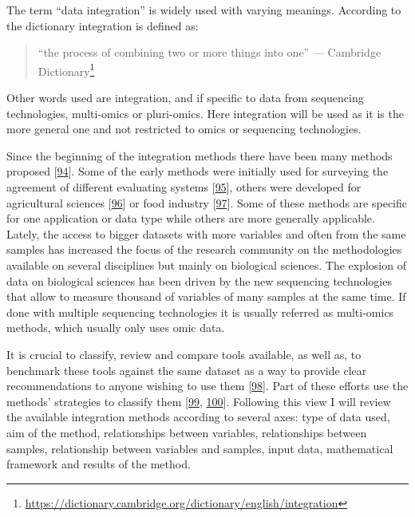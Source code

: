 \documentclass[
  12pt,
  a4paper,
  twoside,
  openright]{book}
\DeclareRobustCommand{\href}[2]{#2\footnote{\url{#1}}}
\begin{document}
The term ``data integration'' is widely used with varying meanings.
According to the dictionary integration is defined as:

\begin{quote}
``the process of combining two or more things into one'' --- \href{https://dictionary.cambridge.org/dictionary/english/integration}{Cambridge Dictionary}
\end{quote}

Other words used are integration, and if specific to data from sequencing technologies, multi-omics or pluri-omics.
Here integration will be used as it is the more general one and not restricted to omics or sequencing technologies.

Since the beginning of the integration methods there have been many methods proposed {[}\protect\hyperlink{ref-krassowski2020}{94}{]}.
Some of the early methods were initially used for surveying the agreement of different evaluating systems {[}\protect\hyperlink{ref-yannakoudakis2015}{95}{]}, others were developed for agricultural sciences {[}\protect\hyperlink{ref-hotelling_relations_1936}{96}{]} or food industry {[}\protect\hyperlink{ref-biancolillo}{97}{]}.
Some of these methods are specific for one application or data type while others are more generally applicable.
Lately, the access to bigger datasets with more variables and often from the same samples has increased the focus of the research community on the methodologies available on several disciplines but mainly on biological sciences.
The explosion of data on biological sciences has been driven by the new sequencing technologies that allow to measure thousand of variables of many samples at the same time.
If done with multiple sequencing technologies it is usually referred as multi-omics methods, which usually only uses omic data.

It is crucial to classify, review and compare tools available, as well as, to benchmark these tools against the same dataset as a way to provide clear recommendations to anyone wishing to use them {[}\protect\hyperlink{ref-wu_selective_2019}{98}{]}.
Part of these efforts use the methods' strategies to classify them {[}\protect\hyperlink{ref-cavill2016}{99}, \protect\hyperlink{ref-chongComputationalApproachesIntegrative2017}{100}{]}.
Following this view I will review the available integration methods according to several axes: type of data used, aim of the method, relationships between variables, relationships between samples, relationship between variables and samples, input data, mathematical framework and results of the method.
\end{document}
